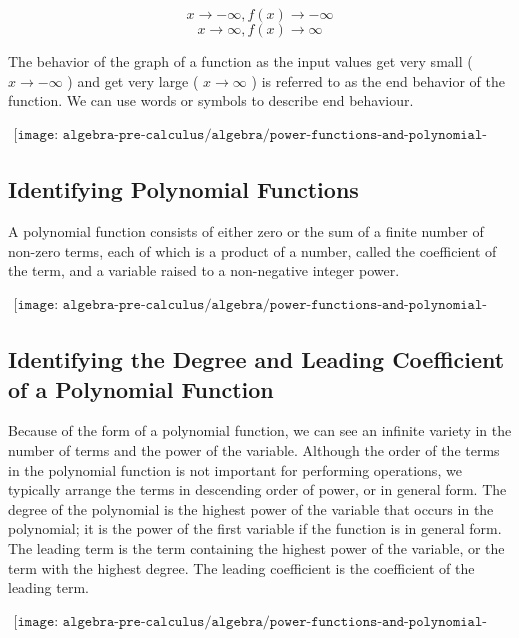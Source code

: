 $$ x\rightarrow - \infty, f(x)\rightarrow - \infty $$
$$ x\rightarrow \infty, f(x)\rightarrow \infty $$

The behavior of the graph of a function as the input values get very small ( $x\rightarrow-\infty$ ) and get very large ( $x\rightarrow \infty$ ) is
referred to as the end behavior of the function. We can use words or symbols to describe end behaviour.

\begin{align*}
    \texttt{[image: algebra-pre-calculus/algebra/power-functions-and-polynomial-functions/even\_odd\_power.png]}
\end{align*} \break

\subsection{Identifying Polynomial Functions}
A polynomial function consists of either zero or the sum of a finite
number of non-zero terms, each of which is a product of a number, called the coefficient of the term, and a variable
raised to a non-negative integer power.

\begin{align*}
    \texttt{[image: algebra-pre-calculus/algebra/power-functions-and-polynomial-functions/polynomial\_function\_identifiy.png]}
\end{align*} \break

\subsection{Identifying the Degree and Leading Coefficient of a Polynomial Function}
Because of the form of a polynomial function, we can see an infinite variety in the number of terms and the power of the
variable. Although the order of the terms in the polynomial function is not important for performing operations, we
typically arrange the terms in descending order of power, or in general form. The degree of the polynomial is the
highest power of the variable that occurs in the polynomial; it is the power of the first variable if the function is in
general form. The leading term is the term containing the highest power of the variable, or the term with the highest
degree. The leading coefficient is the coefficient of the leading term.

\begin{align*}
    \texttt{[image: algebra-pre-calculus/algebra/power-functions-and-polynomial-functions/leading\_coefficient.png]}
\end{align*} \break

